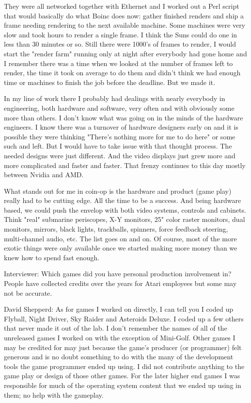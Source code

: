 They were all networked together with Ethernet and I worked out a Perl script that would basically do what Boinc does now: gather finished renders and ship a frame needing rendering to the next available machine. Some machines were very slow and took hours to render a single frame. I think the Suns could do one in less than 30 minutes or so. Still there were 1000's of frames to render, I would start the "render farm" running only at night after everybody had gone home and I remember there was a time when we looked at the number of frames left to render, the time it took on average to do them and didn't think we had enough time or machines to finish the job before the deadline. But we made it.


In my line of work there I probably had dealings with nearly everybody in engineering, both hardware and software, very often and with obviously some more than others. I don't know what was going on in the minds of the hardware engineers. I know there was a turnover of hardware designers early on and it is possible they were thinking "There's nothing more for me to do here" or some such and left. But I would have to take issue with that thought process. The needed designs were just different. And the video displays just grew more and more complicated and faster and faster. That frenzy continues to this day mostly between Nvidia and AMD.

What stands out for me in coin-op is the hardware and product (game play) really had to be cutting edge. All the time to be a success. And being hardware based, we could push the envelop with both video systems, controls and cabinets. Think "real" submarine periscopes, X-Y monitors, 25" color raster monitors, dual monitors, mirrors, black lights, trackballs, spinners, force feedback steering, multi-channel audio, etc. The list goes on and on. Of course, most of the more exotic things were only available once we started making more money than we knew how to spend fast enough.

\textcolor{interviewer}{Interviewer:} Which games did you have personal production involvement in? People have collected credits over the years for Atari employees but some may not be accurate.

\textcolor{interviewee}{David Shepperd:} As for games I worked on directly, I can tell you I coded up Flyball, Night Driver, Sky Raider and Asteroids Deluxe. I coded up a few others that never made it out of the lab. I don't remember the names of all of the unreleased games I worked on with the exception of Mini-Golf. Other games I may be credited for may just because the game's producer (or programmer) felt generous and is no doubt something to do with the many of the development tools the game programmer ended up using. I did not contribute anything to the game play or design of those other games. For the later higher end games I was responsible for much of the operating system content that we ended up using in them; no help with the gameplay.

